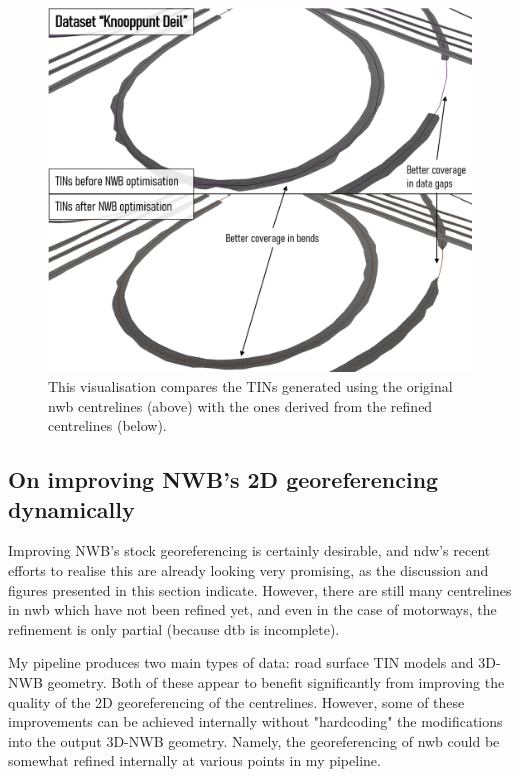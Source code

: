 \begin{figure}
    \centering
    \includegraphics[width=\linewidth]{final_report/figs/nwb_updated_tinconstruction.png}
    \caption[Visualisation of the effects of improving NWB on the TINs]{This visualisation compares the TINs generated using the original \ac{nwb} centrelines (above) with the ones derived from the refined centrelines (below).}
    \label{fig:nwb_updated_tinconstructionn}
\end{figure}

\subsection{On improving NWB's 2D georeferencing dynamically}
\label{sub:nwb_updated_dynamic}

Improving NWB's stock georeferencing is certainly desirable, and \ac{ndw}'s recent efforts to realise this are already looking very promising, as the discussion and figures presented in this section indicate. However, there are still many centrelines in \ac{nwb} which have not been refined yet, and even in the case of motorways, the refinement is only partial (because \ac{dtb} is incomplete).

My pipeline produces two main types of data: road surface TIN models and 3D-NWB geometry. Both of these appear to benefit significantly from improving the quality of the 2D georeferencing of the centrelines. However, some of these improvements can be achieved internally without "hardcoding" the modifications into the output 3D-NWB geometry. Namely, the georeferencing of \ac{nwb} could be somewhat refined internally at various points in my pipeline.

